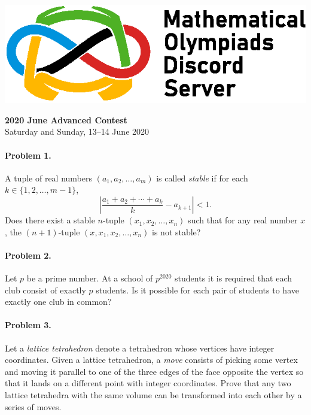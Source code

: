 \documentclass[12pt]{article}
\newcommand*{\currpos}[1]{%
  \zsavepos{#1}%
}
\begin{document}
		\begin{flushleft}
		\includegraphics[scale=0.7]{./MODS_text_right.eps}\\
		\end{flushleft}
		\vspace{15pt}
		\noindent \LARGE\textbf{2020 June Advanced Contest}\\[10pt]
		\noindent \normalsize{Saturday and Sunday, 13--14 June 2020}\\
		\noindent \makebox[\linewidth]{\rule{\textwidth}{0.4pt}}
			
	\normalsize
	
	\paragraph{\currpos{one}Problem 1.} A tuple of real numbers \(\left(a_{1}, a_{2}, \ldots, a_{m}\right)\) is called \emph{stable} if for each \(k \in \{1, 2, \dots, m-1\}\), \[\left\lvert \frac{a_{1}+a_{2}+\cdots+a_{k}}{k}-a_{k+1}\right \rvert < 1.\] Does there exist a stable \(n\)-tuple \(\left(x_{1}, x_{2}, \ldots, x_{n}\right)\) such that for any real number \(x\), the \((n+1)\)-tuple \(\left(x, x_{1}, x_{2}, \ldots, x_{n}\right)\) is not stable?
	
	\paragraph{\currpos{two}Problem 2.} Let \(p\) be a prime number. At a school of \(p^{2020}\) students it is required that each club consist of exactly \(p\) students. Is it possible for each pair of students to have exactly one club in common?
	
	\paragraph{\currpos{three}Problem 3.} Let a \emph{lattice tetrahedron} denote a tetrahedron whose vertices have integer coordinates. Given a lattice tetrahedron, a \emph{move} consists of picking some vertex and moving it parallel to one of the three edges of the face opposite the vertex so that it lands on a different point with integer coordinates. Prove that any two lattice tetrahedra with the same volume can be transformed into each other by a series of moves.
	
\end{document}
